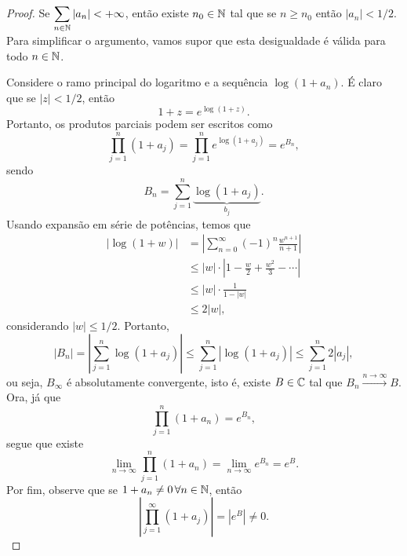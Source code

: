     \begin{proof}
       Se $\displaystyle{\sum_{n\in\mathbb{N}} |a_n| < +\infty }$, então existe $n_0\in\mathbb{N}$
       tal que se $n\geq n_0$ então $|a_n| < 1/2$. Para simplificar o 
       argumento, vamos supor que esta desigualdade é válida para todo $n\in\mathbb{N}$.
       
       Considere o ramo principal do logaritmo e a sequência $\log(1+a_n)$.
       É claro que se $|z| < 1/2$, então
       \begin{equation*}
           1 + z = e^{\log(1+z)}.
       \end{equation*}
       Portanto, os produtos parciais podem ser escritos como
       \begin{equation*}
           \prod_{j=1}^n (1 + a_j) = \prod_{j=1}^n e^{\log(1 + a_j)} = e^{B_n},
       \end{equation*}
       sendo
       \begin{equation*}
           B_n = \sum_{j=1}^n \underbrace{\log(1 + a_j)}_{b_j}.
       \end{equation*}
       Usando expansão em série de potências, temos que
       \begin{align*}
           |\log(1+w)|&=\left| \sum_{n=0}^{\infty} (-1)^n \frac{w^{n+1}}{n+1} \right| \\
                      &\leq |w|\cdot\left| 1 - \frac{w}{2} + \frac{w^2}{3} 
                      - \cdots \right| \\
                      &\leq |w|\cdot\frac{1}{1 - |w|} \\
                      &\leq 2|w|,
       \end{align*}
       considerando $|w| \leq 1/2$. Portanto,
       \begin{equation*}
           |B_n| = \left| \sum_{j=1}^n \log(1 + a_j) \right| 
           \leq \sum_{j=1}^n |\log(1+a_j)|
           \leq \sum_{j=1}^n 2|a_j|,
       \end{equation*}
       ou seja, $B_{\infty}$ é absolutamente convergente, isto é, existe
       $B\in\mathbb{C}$ tal que $B_n \xrightarrow{n\to\infty} B$. Ora, já que
       \begin{equation*}
           \prod_{j=1}^n (1+a_n) = e^{B_n},
       \end{equation*}
       segue que existe
       \begin{equation*}
           \lim_{n\to\infty} \prod_{j=1}^n (1+a_n) = \lim_{n\to\infty} e^{B_n} = e^B.
       \end{equation*}
       Por fim, observe que se $1+a_n \neq 0 \, \forall n\in \mathbb{N}$, então
       \begin{equation*}
           \left| \prod_{j=1}^{\infty} (1+a_j) \right| = |e^B| \neq 0.
       \end{equation*}
    \end{proof}
    
